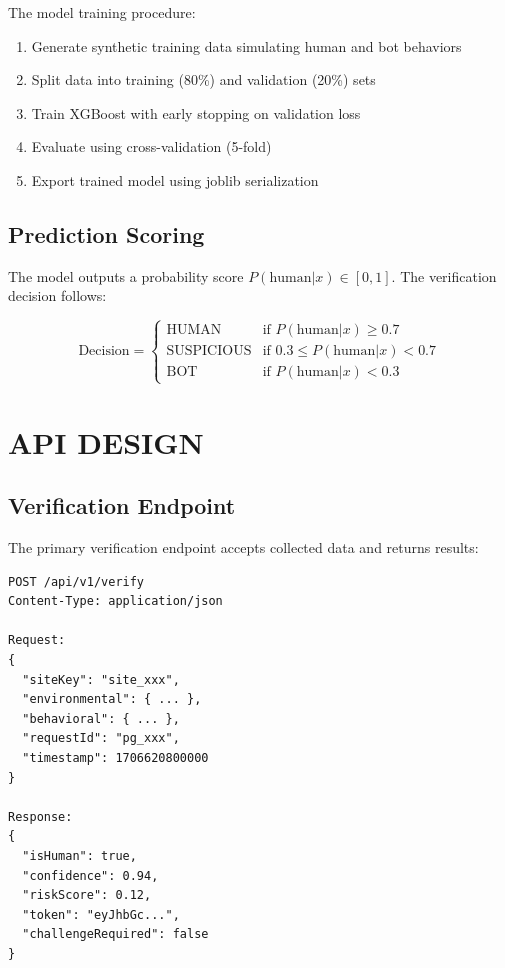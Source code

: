 The model training procedure:
\begin{enumerate}
    \item Generate synthetic training data simulating human and bot behaviors
    \item Split data into training (80\%) and validation (20\%) sets
    \item Train XGBoost with early stopping on validation loss
    \item Evaluate using cross-validation (5-fold)
    \item Export trained model using joblib serialization
\end{enumerate}

\subsection{Prediction Scoring}

The model outputs a probability score $P(\text{human}|x) \in [0, 1]$. The verification decision follows:

$$\text{Decision} = \begin{cases} 
\text{HUMAN} & \text{if } P(\text{human}|x) \geq 0.7 \\
\text{SUSPICIOUS} & \text{if } 0.3 \leq P(\text{human}|x) < 0.7 \\
\text{BOT} & \text{if } P(\text{human}|x) < 0.3
\end{cases}$$

\section{API DESIGN}

\subsection{Verification Endpoint}

The primary verification endpoint accepts collected data and returns results:

\begin{verbatim}
POST /api/v1/verify
Content-Type: application/json

Request:
{
  "siteKey": "site_xxx",
  "environmental": { ... },
  "behavioral": { ... },
  "requestId": "pg_xxx",
  "timestamp": 1706620800000
}

Response:
{
  "isHuman": true,
  "confidence": 0.94,
  "riskScore": 0.12,
  "token": "eyJhbGc...",
  "challengeRequired": false
}
\end{verbatim}

